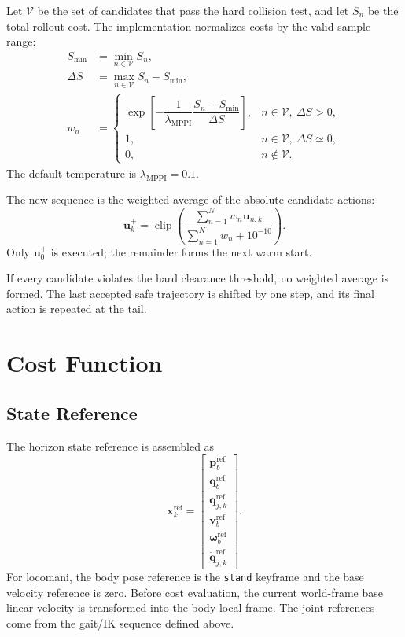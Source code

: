 \documentclass[11pt,a4paper]{article}
\newcommand{\clip}{\operatorname{clip}}
\newcommand{\code}[1]{\texttt{#1}}
\begin{document}
Let $\mathcal{V}$ be the set of candidates that pass the hard collision test,
and let $S_n$ be the total rollout cost. The implementation normalizes costs by
the valid-sample range:
\begin{align}
  S_{\min}&=\min_{n\in\mathcal{V}}S_n,\\
  \Delta S&=\max_{n\in\mathcal{V}}S_n-S_{\min},\\
  w_n&=
  \begin{cases}
    \exp\!\left[
      -\dfrac{1}{\lambda_{\mathrm{MPPI}}}
      \dfrac{S_n-S_{\min}}{\Delta S}
    \right],
    &n\in\mathcal{V},\ \Delta S>0,\\
    1,&n\in\mathcal{V},\ \Delta S\simeq0,\\
    0,&n\notin\mathcal{V}.
  \end{cases}
\end{align}
The default temperature is $\lambda_{\mathrm{MPPI}}=0.1$.

The new sequence is the weighted average of the absolute candidate actions:
\begin{equation}
  \boxed{
  \bm{u}^{+}_k=
  \clip\left(
    \frac{\sum_{n=1}^{N}w_n\bm{u}_{n,k}}
         {\sum_{n=1}^{N}w_n+10^{-10}}
  \right).
  }
\end{equation}
Only $\bm{u}^{+}_0$ is executed; the remainder forms the next warm start.

If every candidate violates the hard clearance threshold, no weighted average
is formed. The last accepted safe trajectory is shifted by one step, and its
final action is repeated at the tail.

\section{Cost Function}

\subsection{State Reference}

The horizon state reference is assembled as
\begin{equation}
  \bm{x}^{\mathrm{ref}}_k=
  \begin{bmatrix}
    \bm{p}^{\mathrm{ref}}_b\\
    \bm{q}^{\mathrm{ref}}_b\\
    \bm{q}^{\mathrm{ref}}_{j,k}\\
    \bm{v}^{\mathrm{ref}}_b\\
    \bm{\omega}^{\mathrm{ref}}_b\\
    \dot{\bm{q}}^{\mathrm{ref}}_{j,k}
  \end{bmatrix}.
\end{equation}
For locomani, the body pose reference is the \code{stand} keyframe and the
base velocity reference is zero. Before cost evaluation, the current
world-frame base linear velocity is transformed into the body-local frame.
The joint references come from the gait/IK sequence defined above.
\end{document}
